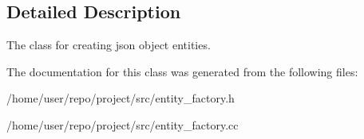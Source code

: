 \subsection{Detailed Description}
The class for creating json object entities. 

The documentation for this class was generated from the following files\+:\begin{DoxyCompactItemize}
\item 
/home/user/repo/project/src/entity\+\_\+factory.\+h\item 
/home/user/repo/project/src/entity\+\_\+factory.\+cc\end{DoxyCompactItemize}
